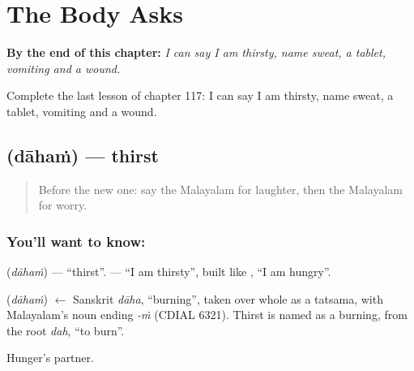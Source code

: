 
\chapter{The Body Asks}
\label{ch:ml-the-body-asks}

\begin{chapteropening}
\textbf{By the end of this chapter:} \emph{I can say I am thirsty, name sweat, a tablet, vomiting and a wound.}

Complete the last lesson of chapter 117: I can say I am thirsty, name sweat, a tablet, vomiting and a wound.
\end{chapteropening}

\section[\texorpdfstring{\ml{ദാഹം} (dāhaṁ)}{ദാഹം (dāhaṁ)}]{ (dāhaṁ) — thirst}

\label{lesson:ML-C117-thirst}



\begin{quote}
Before the new one: say the Malayalam for laughter, then the Malayalam for worry.
\end{quote}

\subsection*{You'll want to know: }
\textbf{} (\emph{dāhaṁ}) — \textquotedblleft{}thirst\textquotedblright{}. \textbf{ } — \textquotedblleft{}I am thirsty\textquotedblright{}, built like \textbf{ }, \textquotedblleft{}I am hungry\textquotedblright{}.

\begin{cousinweb}
\textbf{} (\emph{dāhaṁ}) $\leftarrow$ Sanskrit \emph{dāha}, \textquotedblleft{}burning\textquotedblright{}, taken over whole as a tatsama, with Malayalam's noun ending \emph{-ṁ} (CDIAL 6321). Thirst is named as a burning, from the root \emph{dah}, \textquotedblleft{}to burn\textquotedblright{}.
\end{cousinweb}

\begin{grammarlens}[title={What you've built}]
Hunger's partner.
\end{grammarlens}

